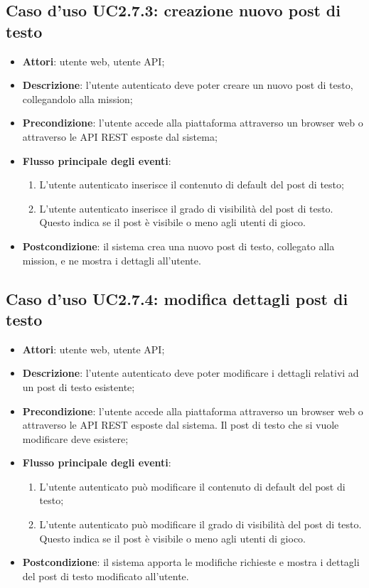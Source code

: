 \subsection{Caso d'uso UC2.7.3: creazione nuovo post di testo}
\begin{itemize}
\item \textbf{Attori}: utente web, utente API;
\item \textbf{Descrizione}: l'utente autenticato deve poter creare un nuovo post di testo, collegandolo alla mission; 
      \item \textbf{Precondizione}: l'utente accede alla piattaforma attraverso un browser web o attraverso le API REST esposte dal sistema;

        \item \textbf{Flusso principale degli eventi}:
          \begin{enumerate}
          \item L'utente autenticato inserisce il contenuto di default del post di testo;
          \item L'utente autenticato inserisce il grado di visibilità del post di testo. Questo indica se il post è visibile o meno agli utenti di gioco.

      \end{enumerate}
    \item \textbf{Postcondizione}: il sistema crea una nuovo post di testo, collegato alla mission, e ne mostra i dettagli all'utente.
  \end{itemize}
\hypertarget{UC2.7.4}{}
\subsection{Caso d'uso UC2.7.4: modifica dettagli post di testo}
\begin{itemize}
\item \textbf{Attori}: utente web, utente API;
\item \textbf{Descrizione}: l'utente autenticato deve poter modificare i dettagli relativi ad un post di testo esistente; 
      \item \textbf{Precondizione}: l'utente accede alla piattaforma attraverso un browser web o attraverso le API REST esposte dal sistema. Il post di testo che si vuole modificare deve esistere;

        \item \textbf{Flusso principale degli eventi}:
          \begin{enumerate}
          \item L'utente autenticato può modificare il contenuto di default del post di testo;
          \item L'utente autenticato può modificare il grado di visibilità del post di testo. Questo indica se il post è visibile o meno agli utenti di gioco.

      \end{enumerate}
    \item \textbf{Postcondizione}: il sistema apporta le modifiche richieste e mostra i dettagli del post di testo modificato all'utente.
  \end{itemize}
\hypertarget{UC2.7.5}{}
